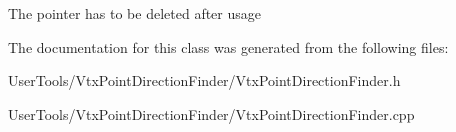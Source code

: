 The pointer has to be deleted after usage 

The documentation for this class was generated from the following files\-:\begin{DoxyCompactItemize}
\item 
User\-Tools/\-Vtx\-Point\-Direction\-Finder/Vtx\-Point\-Direction\-Finder.\-h\item 
User\-Tools/\-Vtx\-Point\-Direction\-Finder/Vtx\-Point\-Direction\-Finder.\-cpp\end{DoxyCompactItemize}
